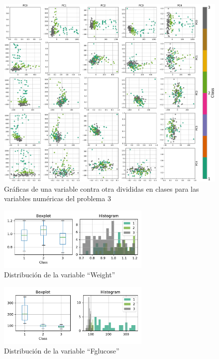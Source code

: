 \documentclass[11pt]{article}
\begin{document}
\begin{figure}[H]
    \centering
    \includegraphics[width = 1.0\textwidth]{3-pca.pdf}
    \caption{Gráficas de una variable contra otra divididas en clases para las variables numéricas del problema 3}
    \label{3-pca}
\end{figure}
\begin{figure}[H]
    \centering
    \includegraphics[width = 0.65\textwidth]{3-Weight-dist.pdf}
    \caption{Distribución de la variable ``Weight''}
    \label{3-Weight-dist}
\end{figure}
\begin{figure}[H]
    \centering
    \includegraphics[width = 0.65\textwidth]{3-Fglucose-dist.pdf}
    \caption{Distribución de la variable ``Fglucose''}
    \label{3-Fglucose-dist}
\end{figure}
\end{document}
